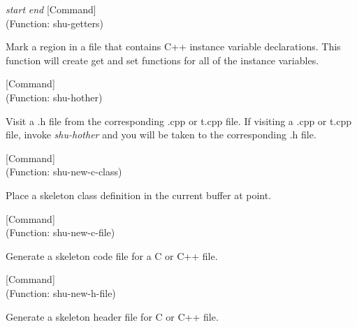 \vspace{1em}
\noindent
{}
\usebox{\funcname}\emph{start} \emph{end}
 \hfill [Command]\\%
 (Function: shu-getters)

\begin{doc-string}
Mark a region in a file that contains C++ instance variable declarations.
This function will create get and set functions for all of the instance
variables.
\end{doc-string}

\vspace{1em}
\noindent
{}
\usebox{\funcname}
 \hfill [Command]\\%
 (Function: shu-hother)

\begin{doc-string}
Visit a .h file from the corresponding .cpp or t.cpp file.  If visiting a .cpp or
t.cpp file, invoke \emph{shu-hother} and you will be taken to the corresponding .h file.
\end{doc-string}

\vspace{1em}
\noindent
{}
\usebox{\funcname}
 \hfill [Command]\\%
 (Function: shu-new-c-class)

\begin{doc-string}
Place a skeleton class definition in the current buffer at point.
\end{doc-string}

\vspace{1em}
\noindent
{}
\usebox{\funcname}
 \hfill [Command]\\%
 (Function: shu-new-c-file)

\begin{doc-string}
Generate a skeleton code file for a C or C++ file.
\end{doc-string}

\vspace{1em}
\noindent
{}
\usebox{\funcname}
 \hfill [Command]\\%
 (Function: shu-new-h-file)

\begin{doc-string}
Generate a skeleton header file for C or C++ file.
\end{doc-string}

